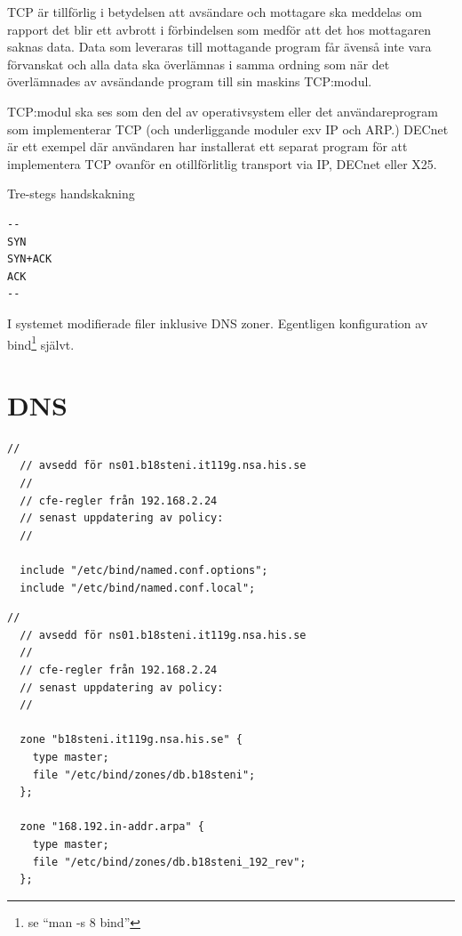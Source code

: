 \documentclass[swedish,10pt,a4paper]{article}
\begin{document}
TCP är tillförlig i betydelsen att avsändare och mottagare ska meddelas om rapport det blir
ett avbrott i förbindelsen som medför att det hos mottagaren saknas data.
Data som leveraras till mottagande program får ävenså inte vara förvanskat och alla data ska överlämnas
i samma ordning som när det överlämnades av avsändande program till sin maskins TCP:modul.

TCP:modul ska ses som den del av operativsystem eller det användareprogram som implementerar TCP (och
underliggande moduler exv IP och ARP.) DECnet är ett exempel där användaren har installerat ett
separat program för att implementera TCP ovanför en otillförlitlig transport via IP, DECnet eller X25.

Tre-stegs handskakning
\begin{verbatim}
--
SYN
SYN+ACK
ACK
--
\end{verbatim}

\appendix

I systemet modifierade filer inklusive DNS zoner.
Egentligen konfiguration av bind\footnote{se ``man -s 8 bind''} självt.

\section{DNS}\label{sec:appendix_bind_config}

\begin{lstlisting}[caption={/etc/bind/named.conf}]
  //
  // avsedd för ns01.b18steni.it119g.nsa.his.se
  //
  // cfe-regler från 192.168.2.24
  // senast uppdatering av policy:
  //

  include "/etc/bind/named.conf.options";
  include "/etc/bind/named.conf.local";
\end{lstlisting}

\begin{lstlisting}[caption={/etc/bind/named.conf.local}]
  //
  // avsedd för ns01.b18steni.it119g.nsa.his.se
  //
  // cfe-regler från 192.168.2.24
  // senast uppdatering av policy:
  //

  zone "b18steni.it119g.nsa.his.se" {
    type master;
    file "/etc/bind/zones/db.b18steni";
  };

  zone "168.192.in-addr.arpa" {
    type master;
    file "/etc/bind/zones/db.b18steni_192_rev";
  };
\end{lstlisting}
\end{document}

